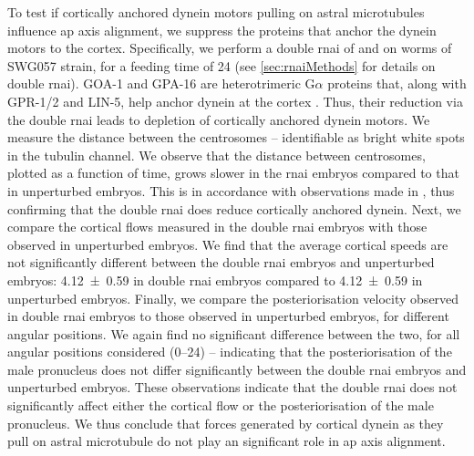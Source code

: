To test if cortically anchored dynein motors pulling on astral microtubules influence \ac{ap} axis alignment, we suppress the proteins that anchor the dynein motors to the cortex. Specifically, we perform a double \ac{rnai} of  and  on worms of SWG057 strain, for a feeding time of \SI{24}{\unitRNAiTime} (see \autoref{sec:rnaiMethods} for details on double \ac{rnai}). GOA-1 and GPA-16 are heterotrimeric G$\alpha$ proteins that, along with GPR-1/2 and LIN-5, help anchor dynein at the cortex \citep{}. Thus, their reduction via the double \ac{rnai} leads to depletion of cortically anchored dynein motors. We measure the distance between the centrosomes -- identifiable as bright white spots in the tubulin channel. We observe that the distance between centrosomes, plotted as a function of time, grows slower in the  \ac{rnai} embryos compared to that in unperturbed embryos. This is in accordance with observations made in \cite{}, thus confirming that the double \ac{rnai} does reduce cortically anchored dynein. Next, we compare the cortical flows measured in the double \ac{rnai} embryos with those observed in unperturbed embryos. We find that the average cortical speeds are not significantly different between the double \ac{rnai} embryos and unperturbed embryos: \SI{4.12 +- 0.59}{\unitCrtxVel} in double \ac{rnai} embryos compared to \SI{4.12 +- 0.59}{\unitCrtxVel} in unperturbed embryos. Finally, we compare the posteriorisation velocity observed in double \ac{rnai} embryos to those observed in unperturbed embryos, for different angular positions. We again find no significant difference between the two, for all angular positions considered (\SIrange{0}{24}{\unitAngle}) -- indicating that the posteriorisation of the male pronucleus does not differ significantly between the double \ac{rnai} embryos and unperturbed embryos. These observations indicate that the double \ac{rnai}  does not significantly affect either the cortical flow or the posteriorisation of the male pronucleus. We thus conclude that forces generated by cortical dynein as they pull on astral microtubule do not play an significant role in \ac{ap} axis alignment.